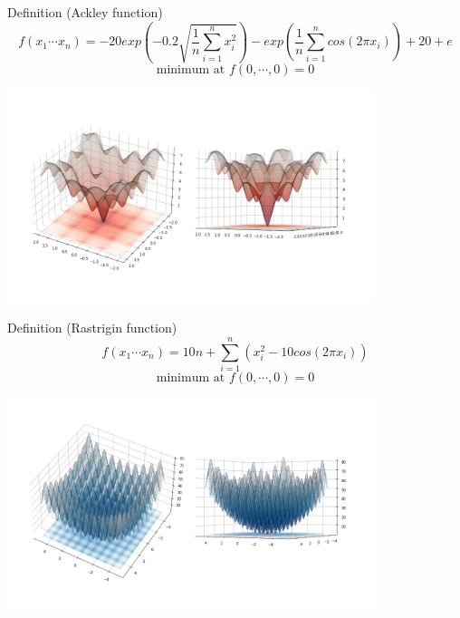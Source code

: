 \documentclass{beamer}
\begin{document}
\begin{frame}
  \begin{block}{Definition (Ackley function)}
    $$f(x_1 \cdots x_n) = -20 exp(-0.2 \sqrt{\frac{1}{n} \sum_{i=1}^n x_i^2}) - exp(\frac{1}{n} \sum_{i=1}^n cos(2\pi x_i)) + 20 + e$$
    $$\text{minimum at }f(0, \cdots, 0) = 0$$
  \end{block}
  \centering
  \includegraphics[width=0.8\textwidth]{figures/introduction-ackley}
\end{frame}
\begin{frame}
  \begin{block}{Definition (Rastrigin function)}
    $$f(x_1 \cdots x_n) = 10n + \sum_{i=1}^n (x_i^2 -10cos(2\pi x_i))$$
    $$\text{minimum at }f(0, \cdots, 0) = 0$$
  \end{block}
  \centering
  \includegraphics[width=0.8\textwidth]{figures/introduction-rastrigin}
\end{frame}
\end{document}
